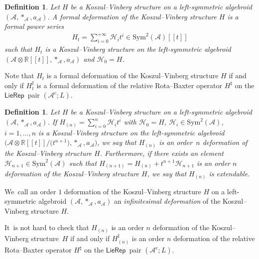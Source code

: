\documentclass[10pt,a4paper]{amsart}
\numberwithin{equation}{section}
\newtheorem{defi}[thm]{Definition}
\newcommand{\Real}{\mathbb R}
\newcommand{\huaA}{\mathcal{A}}
\newcommand{\huaH}{\mathcal{H}}
\newcommand{\Sym}{\mathrm{Sym}}
\newcommand{\LP}{$\mathsf{LieRep}$~}
\begin{document}
\begin{defi}
{\sloppy Let $H$ be a Koszul--Vinberg structure on a left-symmetric algebroid $(\huaA,\ast_\huaA,a_\huaA)$. A {\it formal deformation} of the Koszul--Vinberg structure $H$ is a formal power series
\begin{gather*}
H_t=\sum_{i=0}^{+\infty}\huaH_it^i\in\Sym^2(\huaA)[[t]]
\end{gather*}}\noindent
 such that $H_t$ is a Koszul--Vinberg structure on the left-symmetric algebroid $(\huaA\otimes \Real[[t]],\ast_\huaA,a_\huaA)$ and $\huaH_0=H$.
\end{defi}
Note that $H_t$ is a formal deformation of the Koszul--Vinberg structure $H$ if and only if $H_t^\sharp$ is a formal deformation of the relative Rota--Baxter operator $H^\sharp$ on the \LP pair $(\huaA^c;L)$.

{\sloppy\begin{defi}
Let $H$ be a Koszul--Vinberg structure on a left-symmetric algebroid $(\huaA,\ast_\huaA,a_\huaA)$. If $H_{(n)}=\sum_{i=0}^{n}\huaH_it^i$ with $\huaH_0=H$, $\huaH_i\in\Sym^2(\huaA)$, $i=1,\dots,n$ is a Koszul--Vinberg structure on the left-symmetric algebroid $\big(\huaA\otimes \Real[[t]]/\big(t^{n+1}\big),\ast_\huaA,a_\huaA\big)$, we say that $H_{(n)}$ is an {\it order~$n$ deformation} of the Koszul--Vinberg structure $H$. Furthermore, if there exists an element $\huaH_{n+1}\in\Sym^2(\huaA)$ such that $H_{(n+1)}=H_{(n)}+t^{n+1}\huaH_{n+1}$ is an order $n$ deformation of the Koszul--Vinberg structure $H$, we say that $H_{(n)}$ is {\it extendable}.
\end{defi}}\noindent
 We~call an order $1$ deformation of the Koszul--Vinberg structure $H$ on a left-symmetric algebroid $(\huaA,\ast_\huaA,a_\huaA)$ an {\it infinitesimal deformation} of the Koszul--Vinberg structure $H$.

It~is not hard to check that $H_{(n)}$ is an order $n$ deformation of the Koszul--Vinberg structure~$H$ if and only if $H_{(n)}^\sharp$ is an order $n$ deformation of the relative Rota--Baxter operator $H^\sharp$ on the \LP pair $(\huaA^c;L)$.
\end{document}
